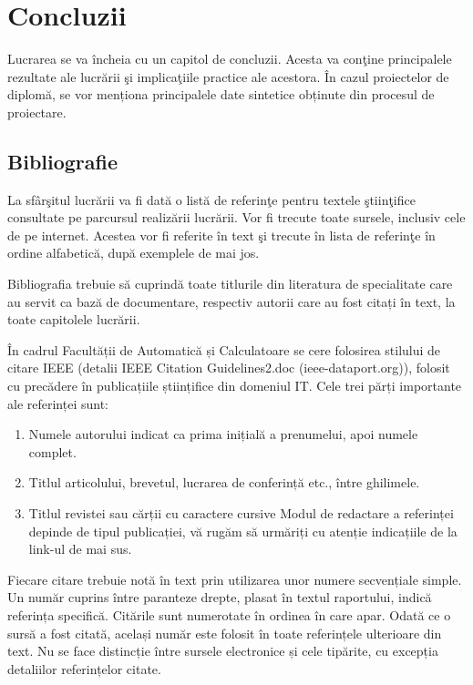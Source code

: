 \chapter{Concluzii}
\thispagestyle{pagestyle}

Lucrarea se va încheia cu un capitol de concluzii. Acesta va conţine principalele rezultate ale lucrării şi implicaţiile practice ale acestora. În cazul proiectelor de diplomă, se vor menționa principalele date sintetice obținute din procesul de proiectare.

\section{Bibliografie}
La sfârşitul lucrării va fi dată o listă de referinţe pentru textele ştiinţifice consultate pe parcursul realizării lucrării. Vor fi trecute toate sursele, inclusiv cele de pe internet. Acestea vor fi referite în text şi trecute în lista de referinţe în ordine alfabetică, după exemplele de mai jos. 

Bibliografia trebuie să cuprindă toate titlurile din literatura de specialitate care au servit ca bază de documentare, respectiv autorii care au fost citați în text, la toate capitolele lucrării. 

În cadrul Facultății de Automatică și Calculatoare se cere folosirea stilului de citare IEEE (detalii IEEE Citation Guidelines2.doc (ieee-dataport.org)), folosit cu precădere în publicațiile științifice din domeniul IT. Cele trei părți importante ale referinței sunt:
\begin{enumerate}[leftmargin=2cm,topsep=1.15pt,itemsep=1.15pt,partopsep=1.15pt,parsep=1.15pt,label=\alph*.]
   \item Numele autorului indicat ca prima inițială a prenumelui, apoi numele complet.
   \item Titlul articolului, brevetul, lucrarea de conferință etc., între ghilimele.
   \item Titlul revistei sau cărții cu caractere cursive
Modul de redactare a referinței depinde de tipul publicației, vă rugăm să urmăriți cu atenție indicațiile de la link-ul de mai sus.
\end{enumerate}
	 
Fiecare citare trebuie notă în text prin utilizarea unor numere secvențiale simple. Un număr cuprins între paranteze drepte, plasat în textul raportului, indică referința specifică. Citările sunt numerotate în ordinea în care apar. Odată ce o sursă a fost citată, același număr este folosit în toate referințele ulterioare din text. Nu se face distincție între sursele electronice și cele tipărite, cu excepția detaliilor referințelor citate.

